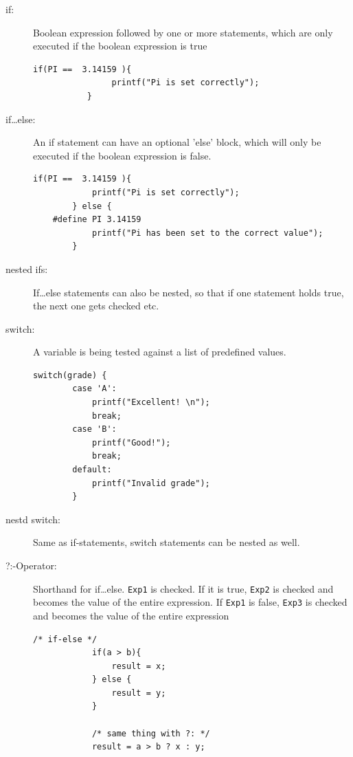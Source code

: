 \documentclass[a4paper, 11pt]{article}
\newcommand{\code}[1]{\texttt{#1}}
\begin{document}
\begin{description}
    \item[if: ] Boolean expression followed by one or more statements, which are only executed if the boolean expression is true \\
        \begin{lstlisting}[frame=none, numbers=none]
           if(PI ==  3.14159 ){
                printf("Pi is set correctly");
           }
        \end{lstlisting}
    \item[if\ldots else: ] An if statement can have an optional 'else' block, which will only be executed if the boolean expression is false. \\
        \begin{lstlisting}[frame=none, numbers=none]
        if(PI ==  3.14159 ){
            printf("Pi is set correctly");
        } else {
    #define PI 3.14159
            printf("Pi has been set to the correct value");
        }
        \end{lstlisting}
    \item[nested ifs: ] If\ldots else statements can also be nested, so that if one statement holds true, the next one gets checked etc.
    \item[switch: ] A variable is being tested against a list of predefined values. \\
        \begin{lstlisting}[frame=none, numbers=none]
        switch(grade) {
        case 'A':
            printf("Excellent! \n");
            break;
        case 'B':
            printf("Good!");
            break;
        default:
            printf("Invalid grade");
        }
        \end{lstlisting}
    \item[nestd switch: ] Same as if-statements, switch statements can be nested as well.
    \item[?:-Operator: ] Shorthand for if\ldots else. \code{Exp1} is checked. If it is true, \code{Exp2} is checked and becomes the value of the entire expression. If \code{Exp1} is false, \code{Exp3} is checked and becomes the value of the entire expression \\
        \begin{lstlisting}[frame=none, numbers=none]
            /* if-else */
            if(a > b){
                result = x;
            } else {
                result = y;
            }

            /* same thing with ?: */
            result = a > b ? x : y;
            \end{lstlisting}

\end{description}
\end{document}
